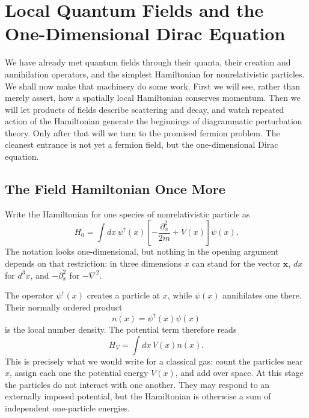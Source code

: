 \chapter{Local Quantum Fields and the One-Dimensional Dirac Equation}

We have already met quantum fields through their quanta, their creation and annihilation operators, and the simplest Hamiltonian for nonrelativistic particles. We shall now make that machinery do some work. First we will see, rather than merely assert, how a spatially local Hamiltonian conserves momentum. Then we will let products of fields describe scattering and decay, and watch repeated action of the Hamiltonian generate the beginnings of diagrammatic perturbation theory. Only after that will we turn to the promised fermion problem. The cleanest entrance is not yet a fermion field, but the one-dimensional Dirac equation.

\section{The Field Hamiltonian Once More}

Write the Hamiltonian for one species of nonrelativistic particle as
\begin{equation}
H_0=\int dx\,
\psi^\dagger(x)
\left[-\frac{\partial_x^2}{2m}+V(x)\right]
\psi(x).
\label{eq:l9-nonrel-hamiltonian}
\end{equation}
The notation looks one-dimensional, but nothing in the opening argument depends on that restriction: in three dimensions \(x\) can stand for the vector \(\mathbf{x}\), \(dx\) for \(d^3x\), and \(-\partial_x^2\) for \(-\nabla^2\).

The operator \(\psi^\dagger(x)\) creates a particle at \(x\), while \(\psi(x)\) annihilates one there. Their normally ordered product
\begin{equation}
n(x)=\psi^\dagger(x)\psi(x)
\end{equation}
is the local number density. The potential term therefore reads
\begin{equation}
H_V=\int dx\,V(x)n(x).
\end{equation}
This is precisely what we would write for a classical gas: count the particles near \(x\), assign each one the potential energy \(V(x)\), and add over space. At this stage the particles do not interact with one another. They may respond to an externally imposed potential, but the Hamiltonian is otherwise a sum of independent one-particle energies.

